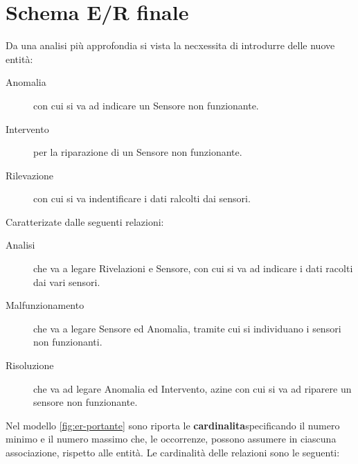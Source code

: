 \section{Schema E/R finale}
Da una analisi più approfondia si vista la necxessita di introdurre delle nuove entità:
\begin{description}
\item [Anomalia] con cui si va ad indicare un Sensore non funzionante.
\item [Intervento] per la riparazione di un Sensore non funzionante.
\item [Rilevazione] con cui si va indentificare i dati ralcolti dai sensori.
\end{description}
Caratterizate dalle seguenti relazioni:
\begin{description}
\item [Analisi] che va a legare Rivelazioni e Sensore, con cui si va ad indicare i dati racolti dai vari sensori.
\item [Malfunzionamento] che va a legare Sensore ed Anomalia, tramite cui si individuano i sensori non funzionanti.
\item [Risoluzione] che va ad legare Anomalia ed Intervento, azine con cui si va ad riparere un sensore non funzionante.
\end{description}
Nel modello \ref{fig:er-portante} sono riporta le \textbf{cardinalita}specificando il numero minimo e il numero massimo che, le occorrenze, possono assumere in ciascuna associazione, rispetto alle entità. Le cardinalità delle relazioni sono le seguenti: 
